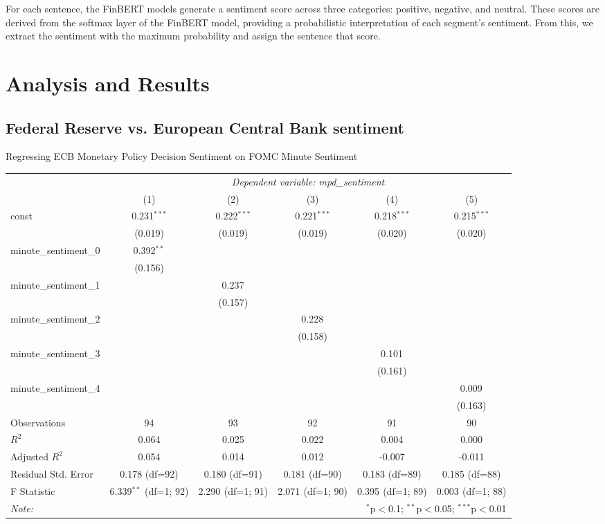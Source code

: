 \documentclass[12pt, letterpaper]{article}
\begin{document}
For each sentence, the FinBERT models generate a sentiment score across three categories: positive, negative, and neutral. 
These scores are derived from the softmax layer of the FinBERT model, providing a probabilistic interpretation of each segment's sentiment. From this, we extract the sentiment with the maximum probability and assign the sentence that score.

\section{Analysis and Results}

\subsection{Federal Reserve vs. European Central Bank sentiment}

Regressing ECB Monetary Policy Decision Sentiment on FOMC Minute Sentiment

\begin{table}[H] 
\begin{adjustbox}{width=\textwidth}
\centering
\begin{tabular}{@{}lccccc@{}}
\hline \hline
& \multicolumn{5}{c}{\textit{Dependent variable: mpd\_sentiment}} \\
\cline{2-6}
& (1) & (2) & (3) & (4) & (5) \\
\hline
const & 0.231$^{***}$ & 0.222$^{***}$ & 0.221$^{***}$ & 0.218$^{***}$ & 0.215$^{***}$ \\
& (0.019) & (0.019) & (0.019) & (0.020) & (0.020) \\
minute\_sentiment\_0 & 0.392$^{**}$ & & & & \\
& (0.156) & & & & \\
minute\_sentiment\_1 & & 0.237$^{}$ & & & \\
& & (0.157) & & & \\
minute\_sentiment\_2 & & & 0.228$^{}$ & & \\
& & & (0.158) & & \\
minute\_sentiment\_3 & & & & 0.101$^{}$ & \\
& & & & (0.161) & \\
minute\_sentiment\_4 & & & & & 0.009$^{}$ \\
& & & & & (0.163) \\
\hline
Observations & 94 & 93 & 92 & 91 & 90 \\
$R^2$ & 0.064 & 0.025 & 0.022 & 0.004 & 0.000 \\
Adjusted $R^2$ & 0.054 & 0.014 & 0.012 & -0.007 & -0.011 \\
Residual Std. Error & 0.178 (df=92) & 0.180 (df=91) & 0.181 (df=90) & 0.183 (df=89) & 0.185 (df=88) \\
F Statistic & 6.339$^{**}$ (df=1; 92) & 2.290$^{}$ (df=1; 91) & 2.071$^{}$ (df=1; 90) & 0.395$^{}$ (df=1; 89) & 0.003$^{}$ (df=1; 88) \\
\hline \hline
\textit{Note:} & \multicolumn{5}{r}{$^{*}$p$<$0.1; $^{**}$p$<$0.05; $^{***}$p$<$0.01} \\
\end{tabular}
\end{adjustbox}
\end{table}
\end{document}
